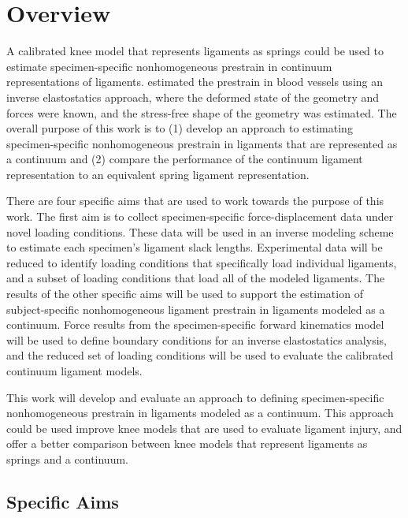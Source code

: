 \section{Overview}
A calibrated knee model that represents ligaments as springs could be used to estimate specimen-specific nonhomogeneous prestrain in continuum representations of ligaments. \cite{lu_computational_2007} estimated the prestrain in blood vessels using an inverse elastostatics approach, where the deformed state of the geometry and forces were known, and the stress-free shape of the geometry was estimated. The overall purpose of this work is to (1) develop an approach to estimating specimen-specific nonhomogeneous prestrain in ligaments that are represented as a continuum and (2) compare the performance of the continuum ligament representation to an equivalent spring ligament representation.

There are four specific aims that are used to work towards the purpose of this work. The first aim is to collect specimen-specific force-displacement data under novel loading conditions. These data will be used in an inverse modeling scheme to estimate each specimen's ligament slack lengths. Experimental data will be reduced to identify loading conditions that specifically load individual ligaments, and a subset of loading conditions that load all of the modeled ligaments. The results of the other specific aims will be used to support the estimation of subject-specific nonhomogeneous ligament prestrain in ligaments modeled as a continuum. Force results from the specimen-specific forward kinematics model will be used to define boundary conditions for an inverse elastostatics analysis, and the reduced set of loading conditions will be used to evaluate the calibrated continuum ligament models.

This work will develop and evaluate an approach to defining specimen-specific nonhomogeneous prestrain in ligaments modeled as a continuum. This approach could be used improve knee models that are used to evaluate ligament injury, and offer a better comparison between knee models that represent ligaments as springs and a continuum. 

\subsection{Specific Aims}

